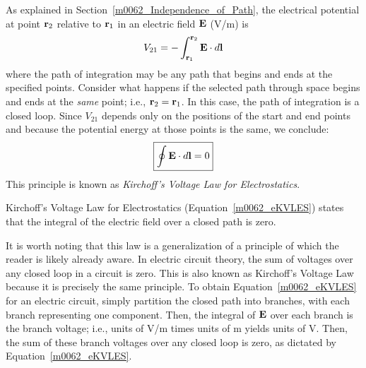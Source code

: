 

\label{m0016_Kirchoffs_Voltage_Law_Electrostatics_Integral_Form} %

As explained in Section~\ref{m0062_Independence_of_Path}, the electrical potential at point ${\bf r}_2$ relative to ${\bf r}_1$ in an electric field ${\bf E}$ (V/m) is
%
\begin{equation}
V_{21} = - \int_{{\bf r}_1}^{{\bf r}_2} {\bf E} \cdot d{\bf l}
\end{equation}
%
where the path of integration may be any path that begins and ends at the specified points.
Consider what happens if the selected path through space begins and ends at the \emph{same} point; i.e., ${\bf r}_2={\bf r}_1$.  
In this case, the path of integration is a closed loop.  
Since $V_{21}$ depends only on the positions of the start and end points and because the potential energy at those points is the same, we conclude:
% 
\begin{equation}  
\boxed{ 
\oint{ {\bf E} \cdot d{\bf l} } = 0
}
\label{m0062_eKVLES}
\end{equation}
%
This principle is known as \emph{Kirchoff's Voltage Law for Electrostatics}.

\begin{mdframed}[backgroundcolor=yellow!20,nobreak=true] 
Kirchoff's Voltage Law for Electrostatics (Equation~\ref{m0062_eKVLES}) states that the integral of the electric field over a closed path is zero. 
\end{mdframed}

It is worth noting that this law is a generalization of a principle of which the reader is likely already aware. 
In electric circuit theory, the sum of voltages over any closed loop in a circuit is zero.
This is also known as Kirchoff's Voltage Law because it is precisely the same principle.
To obtain Equation~\ref{m0062_eKVLES} for an electric circuit, simply partition the closed path into branches, with each branch representing one component.
Then, the integral of ${\bf E}$ over each branch is the branch voltage; i.e., units of V/m times units of m yields units of V. 
Then, the sum of these branch voltages over any closed loop is zero, as dictated by Equation~\ref{m0062_eKVLES}.

